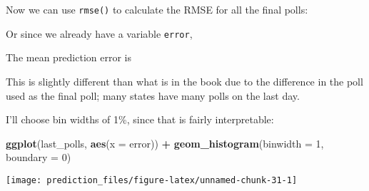 \documentclass[]{book}
\newenvironment{Shaded}{\begin{snugshade}}{\end{snugshade}}
\newcommand{\KeywordTok}[1]{\textcolor[rgb]{0.13,0.29,0.53}{\textbf{#1}}}
\newcommand{\DataTypeTok}[1]{\textcolor[rgb]{0.13,0.29,0.53}{#1}}
\newcommand{\DecValTok}[1]{\textcolor[rgb]{0.00,0.00,0.81}{#1}}
\newcommand{\StringTok}[1]{\textcolor[rgb]{0.31,0.60,0.02}{#1}}
\newcommand{\CommentTok}[1]{\textcolor[rgb]{0.56,0.35,0.01}{\textit{#1}}}
\newcommand{\OperatorTok}[1]{\textcolor[rgb]{0.81,0.36,0.00}{\textbf{#1}}}
\newcommand{\NormalTok}[1]{#1}
\theoremstyle{definition}
\theoremstyle{definition}
\theoremstyle{definition}
\theoremstyle{remark}
\begin{document}
Now we can use \texttt{rmse()} to calculate the RMSE for all the final
polls:

\begin{Shaded}
\end{Shaded}

Or since we already have a variable \texttt{error},

\begin{Shaded}
\end{Shaded}

The mean prediction error is

\begin{Shaded}
\end{Shaded}

This is slightly different than what is in the book due to the
difference in the poll used as the final poll; many states have many
polls on the last day.

I'll choose bin widths of 1\%, since that is fairly interpretable:

\begin{Shaded}
\begin{Highlighting}[]
\KeywordTok{ggplot}\NormalTok{(last_polls, }\KeywordTok{aes}\NormalTok{(}\DataTypeTok{x =}\NormalTok{ error)) }\OperatorTok{+}
\StringTok{  }\KeywordTok{geom_histogram}\NormalTok{(}\DataTypeTok{binwidth =} \DecValTok{1}\NormalTok{, }\DataTypeTok{boundary =} \DecValTok{0}\NormalTok{)}
\end{Highlighting}
\end{Shaded}

\begin{center}\texttt{[image: prediction\_files/figure-latex/unnamed-chunk-31-1]} \end{center}
\end{document}
